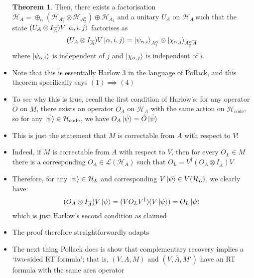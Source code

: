 \documentclass[12pt,a4paper]{article}
\numberwithin{equation}{section}
\newcommand{\Hcode}{\mathcal{H}_{\text{code}}}
\newcommand{\ol}[1]{\overline{#1}}
\theoremstyle{definition}
\theoremstyle{theorem}
\newtheorem{theorem}{Theorem}[section]
\theoremstyle{example}
\begin{document}
\begin{itemize}
\begin{theorem}
			Then, there exists a factorisation $\mathcal{H}_{A}=\oplus_{\alpha}(\mathcal{H}_{A_{1}^{\alpha}}\otimes\mathcal{H}_{A_{2}^{\alpha}})\oplus\mathcal{H}_{A_{3}}$ and a unitary $U_{A}$ on $\mathcal{H}_{A}$ such that the state $(U_{A}\otimes I_{\ol{A}})V\ket{\alpha,i,j}$ factorises as
			\begin{equation}
				(U_{A}\otimes I_{\ol{A}})V\ket{\alpha,i,j}=\ket{\psi_{\alpha,i}}_{A_{1}^{\alpha}}\otimes\ket{\chi_{\alpha,j}}_{A_{2}^{\alpha}\ol{A}}
			\end{equation}
			where $\ket{\psi_{\alpha,i}}$ is independent of $j$ and $\ket{\chi_{\alpha,j}}$ is independent of $i$.
		\end{theorem}
		\item Note that this is essentially Harlow 3 in the language of Pollack, and this theorem specifically says $(1)\implies(4)$
		\item To see why this is true, recall the first condition of Harlow's: for any operator $\tilde{O}$ on $M$, there exists an operator $O_{A}$ on $\mathcal{H}_{A}$ with the same action on $\Hcode$, so for any $\ket{\tilde{\psi}}\in\Hcode$, we have $O_{A}\ket{\tilde{\psi}}=\tilde{O}\ket{\tilde{\psi}}$
		\item This is just the statement that $M$ is correctable from $A$ with respect to $V$!
		\item Indeed, if $M$ is correctable from $A$ with respect to $V$, then for every $O_{L}\in M$ there is a corresponding $O_{A}\in\mathcal{L}(\mathcal{H}_{A})$ such that $O_{L}=V^{\dagger}(O_{A}\otimes I_{\ol{A}})V$
		\item Therefore, for any $\ket{\psi}\in\mathcal{H}_{L}$ and corresponding $V\ket{\psi}\in V(\mathcal{H}_{L})$, we clearly have:
		\begin{equation}
			(O_{A}\otimes I_{\ol{A}})V\ket{\psi}=(VO_{L}V^{\dagger})(V\ket{\psi})=O_{L}\ket{\psi}
		\end{equation}
		which is just Harlow's second condition as claimed
		\item The proof therefore straightforwardly adapts
		\item The next thing Pollack does is show that complementary recovery implies a `two-sided RT formula'; that is, $(V,A,M)$ and $(V,\ol{A},M')$ have an RT formula with the same area operator
	\end{itemize}
\end{document}
